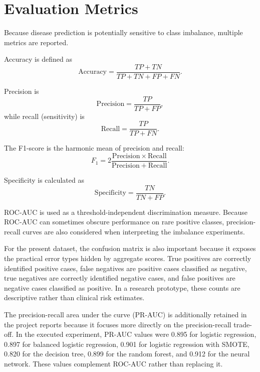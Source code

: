 \documentclass[10pt]{article}
\begin{document}
\section{Evaluation Metrics}
Because disease prediction is potentially sensitive to class imbalance, multiple metrics are reported.

Accuracy is defined as
\begin{equation}
\mathrm{Accuracy}=\frac{TP+TN}{TP+TN+FP+FN}.
\end{equation}

Precision is
\begin{equation}
\mathrm{Precision}=\frac{TP}{TP+FP},
\end{equation}
while recall (sensitivity) is
\begin{equation}
\mathrm{Recall}=\frac{TP}{TP+FN}.
\end{equation}

The F1-score is the harmonic mean of precision and recall:
\begin{equation}
F_1=2\frac{\mathrm{Precision}\times\mathrm{Recall}}{\mathrm{Precision}+\mathrm{Recall}}.
\end{equation}

Specificity is calculated as
\begin{equation}
\mathrm{Specificity}=\frac{TN}{TN+FP}.
\end{equation}

ROC-AUC is used as a threshold-independent discrimination measure. Because ROC-AUC can sometimes obscure performance on rare positive classes, precision-recall curves are also considered when interpreting the imbalance experiments.


For the present dataset, the confusion matrix is also important because it exposes the practical error types hidden by aggregate scores. True positives are correctly identified positive cases, false negatives are positive cases classified as negative, true negatives are correctly identified negative cases, and false positives are negative cases classified as positive. In a research prototype, these counts are descriptive rather than clinical risk estimates.

The precision-recall area under the curve (PR-AUC) is additionally retained in the project reports because it focuses more directly on the precision-recall trade-off. In the executed experiment, PR-AUC values were 0.895 for logistic regression, 0.897 for balanced logistic regression, 0.901 for logistic regression with SMOTE, 0.820 for the decision tree, 0.899 for the random forest, and 0.912 for the neural network. These values complement ROC-AUC rather than replacing it.
\end{document}
